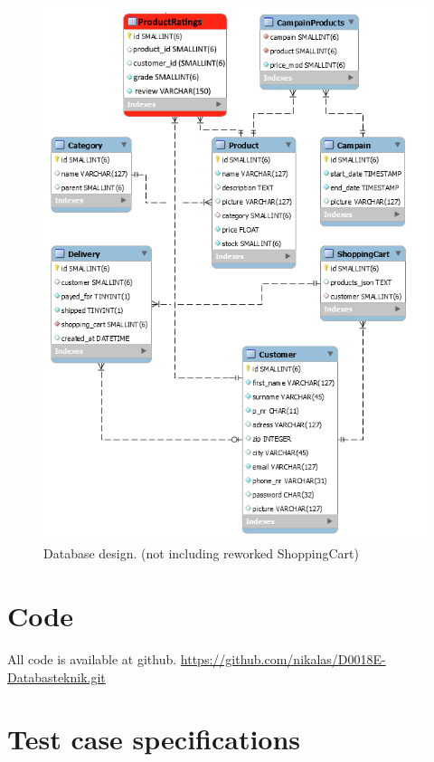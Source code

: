 \documentclass[paper=a4, fontsize=11pt]{report} %
\begin{document}
\begin{figure}
	\includegraphics[width=\textwidth]{artifacts/db_implemented_1_3.png}
	\caption{Database design. (not including reworked ShoppingCart)}
	\label{fig:db}
\end{figure}

\section*{Code}
All code is available at github.
\url{https://github.com/nikalas/D0018E-Databasteknik.git}

\section*{Test case specifications}

\end{document}
